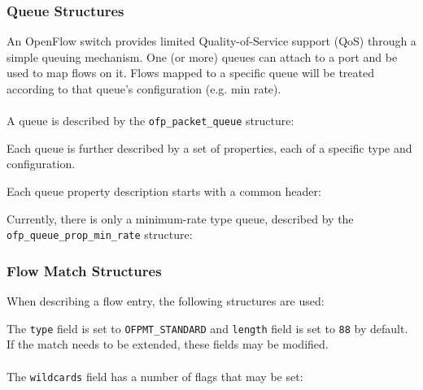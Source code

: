 \subsubsection{Queue Structures}
\label{cts:qos}
An OpenFlow switch provides limited Quality-of-Service support
  (QoS) through a simple queuing
mechanism. One (or more) queues can attach to a port and be used to map flows
on it. Flows mapped to a specific queue will be treated according to
that queue's configuration (e.g. min rate).
\\\\
A queue is described by the \verb|ofp_packet_queue| structure:

Each queue is further described by a set of properties, each of a
specific type and configuration.

Each queue property description starts with a common header:

Currently, there is only a minimum-rate type queue, described by the
\verb|ofp_queue_prop_min_rate| structure:


\subsubsection{Flow Match Structures}
When describing a flow entry, the following structures are used:




The \verb|type| field is set to \verb|OFPMT_STANDARD| and \verb|length| field is set to \verb|88| by default. If the match needs to be extended, these fields may be modified.
\\\\
The \verb|wildcards| field has a number of flags that may be set:



